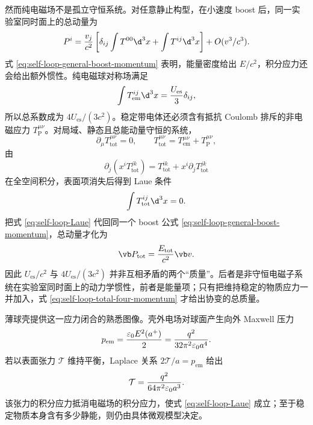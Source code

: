 然而纯电磁场不是孤立守恒系统。对任意静止构型，在小速度 boost 后，同一实验室同时面上的总动量为
\begin{equation}
 P^i={v_j\over c^2}
 \left[
 \delta_{ij}\int T^{00}\d^3x
 +\int T^{ij}\d^3x
 \right]+O(v^3/c^3).
 \label{eq:self-loop-general-boost-momentum}
\end{equation}
式 \eqref{eq:self-loop-general-boost-momentum} 表明，能量密度给出 $E/c^2$，积分应力还会给出额外惯性。纯电磁球对称场满足
\begin{equation*}
 \int T_{\mathrm{em}}^{ij}\d^3x
 ={U_{\mathrm{es}}\over3}\delta_{ij},
\end{equation*}
所以总系数成为 $4U_{\mathrm{es}}/(3c^2)$。稳定带电体还必须含有抵抗 Coulomb 排斥的非电磁应力 $T_{\mathrm P}^{\mu\nu}$。对局域、静态且总能动量守恒的系统，
\begin{equation*}
 \partial_\mu T_{\mathrm{tot}}^{\mu\nu}=0,
 \qquad
 T_{\mathrm{tot}}^{\mu\nu}=T_{\mathrm{em}}^{\mu\nu}+T_{\mathrm P}^{\mu\nu},
\end{equation*}
由
\begin{equation*}
 \partial_j(x^iT_{\mathrm{tot}}^{jk})
 =T_{\mathrm{tot}}^{ik}+x^i\partial_jT_{\mathrm{tot}}^{jk}
\end{equation*}
在全空间积分，表面项消失后得到 Laue 条件
\begin{equation}
 \int T_{\mathrm{tot}}^{ij}\d^3x=0.
 \label{eq:self-loop-Laue}
\end{equation}
把式 \eqref{eq:self-loop-Laue} 代回同一个 boost 公式 \eqref{eq:self-loop-general-boost-momentum}，总动量才化为
\begin{equation}
 \vb P_{\mathrm{tot}}
 ={E_{\mathrm{tot}}\over c^2}\vb v.
 \label{eq:self-loop-total-four-momentum}
\end{equation}
因此 $U_{\mathrm{es}}/c^2$ 与 $4U_{\mathrm{es}}/(3c^2)$ 并非互相矛盾的两个“质量”。后者是非守恒电磁子系统在实验室同时面上的动力学惯性，前者是能量项；只有把维持稳定的物质应力一并加入，式 \eqref{eq:self-loop-total-four-momentum} 才给出协变的总质量。

薄球壳提供这一应力闭合的熟悉图像。壳外电场对球面产生向外 Maxwell 压力
\begin{equation*}
 p_{\mathrm{em}}
 ={\varepsilon_0E^2(a^+)\over2}
 ={q^2\over32\pi^2\varepsilon_0a^4}.
\end{equation*}
若以表面张力 $\mathcal T$ 维持平衡，Laplace 关系 $2\mathcal T/a=p_{\mathrm{em}}$ 给出
\begin{equation*}
 \mathcal T={q^2\over64\pi^2\varepsilon_0a^3}.
\end{equation*}
该张力的积分应力抵消电磁场的积分应力，使式 \eqref{eq:self-loop-Laue} 成立；至于稳定物质本身含有多少静能，则仍由具体微观模型决定。



